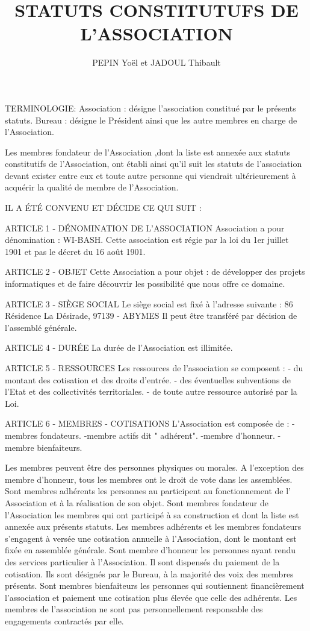 \documentclass[a4paper]{article}
\author{PEPIN Yoël et JADOUL Thibault}
\title{STATUTS CONSTITUTUFS DE L'ASSOCIATION}
\begin{document}
TERMINOLOGIE:
Association : désigne l'association constitué par le présents statuts.
Bureau : désigne le Président ainsi que les autre membres en charge de l'Association.

Les membres fondateur de l'Association ,dont la liste est annexée aux statuts constitutifs de l'Association, ont établi ainsi qu'il suit les statuts de l'association devant exister entre eux et toute autre personne qui viendrait ultérieurement à acquérir la qualité de membre de l'Association.

IL A ÉTÉ CONVENU ET DÉCIDE CE QUI SUIT :


ARTICLE 1 - DÉNOMINATION DE L'ASSOCIATION
Association a pour dénomination : WI-BASH.
Cette association est régie par la loi du 1er juillet 1901 et pas le décret du 16 août 1901.

ARTICLE 2 - OBJET
Cette Association a pour objet : de développer des projets informatiques et de faire découvrir les possibilité que nous offre ce domaine.

ARTICLE 3 - SIÈGE SOCIAL
Le siège social est fixé à l'adresse suivante : 86 Résidence La Désirade, 97139 - ABYMES
Il peut être transféré par décision de l'assemblé générale.

ARTICLE 4 - DURÉE
La durée de l'Association est illimitée.

ARTICLE 5 - RESSOURCES
Les ressources de l'association se composent :
- du montant des cotisation et des droits d'entrée.
- des éventuelles subventions de l'Etat et des collectivités territoriales.
- de toute autre ressource autorisé par la Loi.

ARTICLE 6 - MEMBRES - COTISATIONS
L'Association est composée de :
-membres fondateurs.
-membre actifs dit " adhérent".
-membre d'honneur.
-membre bienfaiteurs.

Les membres peuvent être des personnes physiques ou morales.
A l’exception des membre d'honneur, tous les membres ont le droit de vote dans les assemblées.
Sont membres adhérents les personnes au participent au fonctionnement de l' Association et à la réalisation de son objet.
Sont membres fondateur de l'Association les membres qui ont participé à  sa construction et dont la liste est annexée aux présents statuts.
Les membres adhérents et les membres fondateurs s'engagent à versée une cotisation annuelle à l’Association, dont le montant est fixée en assemblée générale.
Sont membre d'honneur les personnes ayant rendu des services particulier à l'Association. Il sont dispensés du paiement de la cotisation.
Ils sont désignés par le Bureau, à la majorité des voix des membres présents.
Sont membres bienfaiteurs les personnes qui soutiennent financièrement l’association et paiement une cotisation plus élevée que celle des adhérents.
Les membres de l'association ne sont pas personnellement responsable des engagements contractés par elle.
\end{document}
